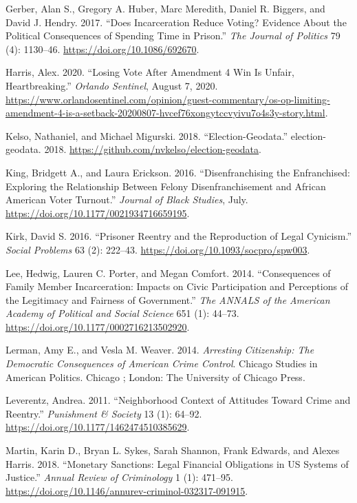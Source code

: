 \documentclass[
  12pt,
]{article}
\newlength{\cslhangindent}
\newenvironment{cslreferences}%
  {\setlength{\parindent}{0pt}%
  \everypar{\setlength{\hangindent}{\cslhangindent}}\ignorespaces}%
  {\par}
\begin{document}
\begin{cslreferences}
\leavevmode\hypertarget{ref-Gerber2017}{}%
Gerber, Alan S., Gregory A. Huber, Marc Meredith, Daniel R. Biggers, and David J. Hendry. 2017. ``Does Incarceration Reduce Voting? Evidence About the Political Consequences of Spending Time in Prison.'' \emph{The Journal of Politics} 79 (4): 1130--46. \url{https://doi.org/10.1086/692670}.

\leavevmode\hypertarget{ref-Harris2020}{}%
Harris, Alex. 2020. ``Losing Vote After Amendment 4 Win Is Unfair, Heartbreaking.'' \emph{Orlando Sentinel}, August 7, 2020. \url{https://www.orlandosentinel.com/opinion/guest-commentary/os-op-limiting-amendment-4-is-a-setback-20200807-hvcef76xongytccvyivu7o4s3y-story.html}.

\leavevmode\hypertarget{ref-Kelso2018}{}%
Kelso, Nathaniel, and Michael Migurski. 2018. ``Election-Geodata.'' election-geodata. 2018. \url{https://github.com/nvkelso/election-geodata}.

\leavevmode\hypertarget{ref-King2016}{}%
King, Bridgett A., and Laura Erickson. 2016. ``Disenfranchising the Enfranchised: Exploring the Relationship Between Felony Disenfranchisement and African American Voter Turnout.'' \emph{Journal of Black Studies}, July. \url{https://doi.org/10.1177/0021934716659195}.

\leavevmode\hypertarget{ref-Kirk2016}{}%
Kirk, David S. 2016. ``Prisoner Reentry and the Reproduction of Legal Cynicism.'' \emph{Social Problems} 63 (2): 222--43. \url{https://doi.org/10.1093/socpro/spw003}.

\leavevmode\hypertarget{ref-Lee2014}{}%
Lee, Hedwig, Lauren C. Porter, and Megan Comfort. 2014. ``Consequences of Family Member Incarceration: Impacts on Civic Participation and Perceptions of the Legitimacy and Fairness of Government.'' \emph{The ANNALS of the American Academy of Political and Social Science} 651 (1): 44--73. \url{https://doi.org/10.1177/0002716213502920}.

\leavevmode\hypertarget{ref-Lerman2014}{}%
Lerman, Amy E., and Vesla M. Weaver. 2014. \emph{Arresting Citizenship: The Democratic Consequences of American Crime Control}. Chicago Studies in American Politics. Chicago ; London: The University of Chicago Press.

\leavevmode\hypertarget{ref-Leverentz2011}{}%
Leverentz, Andrea. 2011. ``Neighborhood Context of Attitudes Toward Crime and Reentry.'' \emph{Punishment \& Society} 13 (1): 64--92. \url{https://doi.org/10.1177/1462474510385629}.

\leavevmode\hypertarget{ref-Martin2018}{}%
Martin, Karin D., Bryan L. Sykes, Sarah Shannon, Frank Edwards, and Alexes Harris. 2018. ``Monetary Sanctions: Legal Financial Obligations in US Systems of Justice.'' \emph{Annual Review of Criminology} 1 (1): 471--95. \url{https://doi.org/10.1146/annurev-criminol-032317-091915}.


\end{cslreferences}
\end{document}
